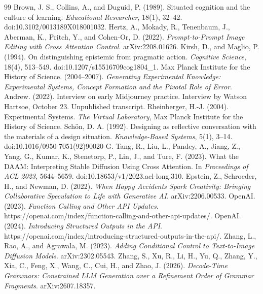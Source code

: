 \documentclass[11pt]{article}
\begin{document}
\begin{thebibliography}{99}
 Brown, J. S., Collins, A., and Duguid, P. (1989). Situated cognition and the culture of learning. \emph{Educational Researcher}, 18(1), 32--42. doi:10.3102/0013189X018001032.
 Hertz, A., Mokady, R., Tenenbaum, J., Aberman, K., Pritch, Y., and Cohen-Or, D. (2022). \emph{Prompt-to-Prompt Image Editing with Cross Attention Control}. arXiv:2208.01626.
 Kirsh, D., and Maglio, P. (1994). On distinguishing epistemic from pragmatic action. \emph{Cognitive Science}, 18(4), 513--549. doi:10.1207/s15516709cog1804\_1.
 Max Planck Institute for the History of Science. (2004--2007). \emph{Generating Experimental Knowledge: Experimental Systems, Concept Formation and the Pivotal Role of Error}.
 Andrew. (2022). Interview on early Midjourney practice. Interview by Watson Hartsoe, October 23. Unpublished transcript.
 Rheinberger, H.-J. (2004). Experimental Systems. \emph{The Virtual Laboratory}, Max Planck Institute for the History of Science.
 Schön, D. A. (1992). Designing as reflective conversation with the materials of a design situation. \emph{Knowledge-Based Systems}, 5(1), 3--14. doi:10.1016/0950-7051(92)90020-G.
 Tang, R., Liu, L., Pandey, A., Jiang, Z., Yang, G., Kumar, K., Stenetorp, P., Lin, J., and Ture, F. (2023). What the DAAM: Interpreting Stable Diffusion Using Cross Attention. In \emph{Proceedings of ACL 2023}, 5644--5659. doi:10.18653/v1/2023.acl-long.310.
 Epstein, Z., Schroeder, H., and Newman, D. (2022). \emph{When Happy Accidents Spark Creativity: Bringing Collaborative Speculation to Life with Generative AI}. arXiv:2206.00533.
 OpenAI. (2023). \emph{Function Calling and Other API Updates}. https://openai.com/index/function-calling-and-other-api-updates/.
 OpenAI. (2024). \emph{Introducing Structured Outputs in the API}. https://openai.com/index/introducing-structured-outputs-in-the-api/.
 Zhang, L., Rao, A., and Agrawala, M. (2023). \emph{Adding Conditional Control to Text-to-Image Diffusion Models}. arXiv:2302.05543.
 Zhang, S., Xu, R., Li, H., Yu, Q., Zhang, Y., Xia, C., Feng, X., Wang, C., Cui, H., and Zhao, J. (2026). \emph{Decode-Time Grammars: Constrained LLM Generation over a Refinement Order of Grammar Fragments}. arXiv:2607.18357.
\end{thebibliography}
\end{document}
